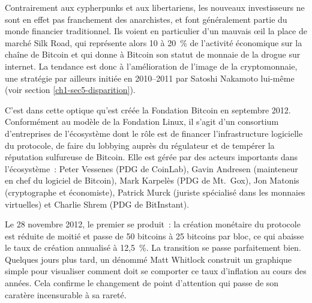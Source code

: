 Contrairement aux cypherpunks et aux libertariens, les nouveaux investisseurs ne sont en effet pas franchement des anarchistes, et font généralement partie du monde financier traditionnel. Ils voient en particulier d'un mauvais œil la place de marché Silk Road, qui représente alors 10 à 20~\% de l'activité économique sur la chaîne de Bitcoin et qui donne à Bitcoin son statut de monnaie de la drogue sur internet. La tendance est donc à l'amélioration de l'image de la cryptomonnaie, une stratégie par ailleurs initiée en 2010--2011 par Satoshi Nakamoto lui-même (voir section \ref{ch1-sec5-disparition}).

C'est dans cette optique qu'est créée la Fondation Bitcoin en septembre 2012. Conformément au modèle de la Fondation Linux, il s'agit d'un consortium d'entreprises de l'écosystème dont le rôle est de financer l'infrastructure logicielle du protocole, de faire du lobbying auprès du régulateur et de tempérer la réputation sulfureuse de Bitcoin. Elle est gérée par des acteurs importants dans l'écosystème~: Peter Vessenes (PDG de CoinLab), Gavin Andresen (mainteneur en chef du logiciel de Bitcoin), Mark Karpelès (PDG de Mt.~Gox), Jon Matonis (cryptographe et économiste), Patrick Murck (juriste spécialisé dans les monnaies virtuelles) et Charlie Shrem (PDG de BitInstant).

Le 28 novembre 2012, le premier  se produit~: la création monétaire du protocole est réduite de moitié et passe de 50 bitcoins à 25 bitcoins par bloc, ce qui abaisse le taux de création annualisé à 12,5~\%. La transition se passe parfaitement bien. Quelques jours plus tard, un dénommé Matt Whitlock construit un graphique simple pour visualiser comment doit se comporter ce taux d'inflation au cours des années. Cela confirme le changement de point d'attention qui passe de son caratère incensurable à sa rareté.

